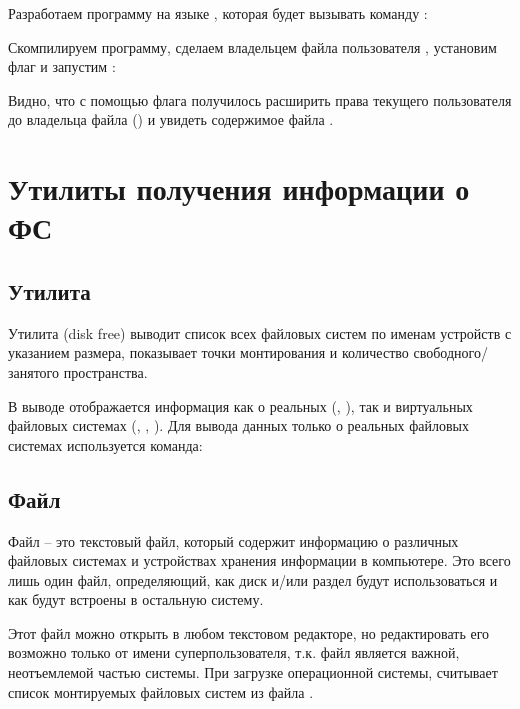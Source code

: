 Разработаем программу на языке , которая будет вызывать команду :


Скомпилируем программу, сделаем владельцем файла пользователя , установим флаг  и запустим :


Видно, что с помощью флага  получилось расширить права текущего пользователя до владельца файла () и увидеть содержимое файла .

\newpage

\section{Утилиты получения информации о ФС}

\subsection{Утилита }

Утилита  (disk free) выводит список всех файловых систем по именам устройств с указанием размера, показывает точки монтирования и количество свободного/занятого пространства.


В выводе отображается информация как о реальных (, ), так и виртуальных файловых системах (, , ). Для вывода данных только о реальных файловых системах используется команда:


\subsection{Файл }

Файл  -- это текстовый файл, который содержит информацию о различных файловых системах и устройствах хранения информации в компьютере. Это всего лишь один файл, определяющий, как диск и/или раздел будут использоваться и как будут встроены в остальную систему. 

Этот файл можно открыть в любом текстовом редакторе, но редактировать его возможно только от имени суперпользователя, т.к. файл является важной, неотъемлемой частью системы. При загрузке операционной системы,  считывает список монтируемых файловых систем из файла .



